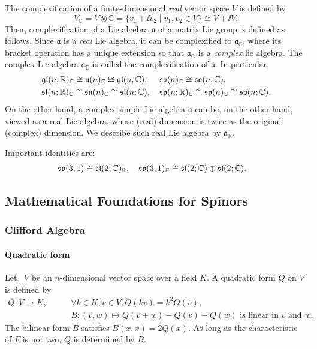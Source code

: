 \documentclass[CheatSheet]{subfiles}
\begin{document}
The complexification of a finite-dimensional \emph{real} vector space $V$ is defined by
\begin{equation}
 V_{\mathbb C}=V\otimes\mathbb C=\{v_1+\ii v_2\mathbin\mid v_1,v_2\in V\}\cong V+\ii V.
\end{equation}
Then, complexification of a Lie algebra $\mathfrak a$ of a matrix Lie group is defined as follows.
Since $\mathfrak a$ is a \emph{real} Lie algebra, it can be complexified to $\mathfrak a_{\mathbb C}$, where its bracket operation has a unique extension so that $\mathfrak a_{\mathbb C}$ is a \emph{complex} lie algebra.
The complex Lie algebra $\mathfrak a_{\mathbb C}$ is called the complexification of $\mathfrak a$.
In particular,
\begin{align}\notag
 &
 \mathop{\mathfrak{gl}}(n;\mathbb R)_{\mathbb C}
 \cong \mathop{\mathfrak{u}}(n)_{\mathbb C}
 \cong \mathop{\mathfrak{gl}}(n;\mathbb C),&
 &
 \mathop{\mathfrak{so}}(n)_{\mathbb C}
 \cong \mathop{\mathfrak{so}}(n;\mathbb C),\\
 &
 \mathop{\mathfrak{sl}}(n;\mathbb R)_{\mathbb C}
 \cong \mathop{\mathfrak{su}}(n)_{\mathbb C}
 \cong \mathop{\mathfrak{sl}}(n;\mathbb C),&
 &
 \mathop{\mathfrak{sp}}(n;\mathbb R)_{\mathbb C}
 \cong \mathop{\mathfrak{sp}}(n)_{\mathbb C}
 \cong \mathop{\mathfrak{sp}}(n;\mathbb C).
\end{align}
On the other hand, a complex simple Lie algebra $\mathfrak a$ can be, on the other hand, viewed as a real Lie algebra, whose (real) dimension is twice as the original (complex) dimension.
We describe such real Lie algebra by $\mathfrak a_{\mathbb R}$.

Important identities are:
\begin{align}
 &\operatorname{\mathfrak{so}}(3,1)\cong \operatorname{\mathfrak{sl}}(2;\mathbb C)_{\mathbb R},&
 &\operatorname{\mathfrak{so}}(3,1)_{\mathbb C}\cong \operatorname{\mathfrak{sl}}(2;\mathbb C)\oplus\operatorname{\mathfrak{sl}}(2;\mathbb C).
\end{align}


\subsection{Mathematical Foundations for Spinors}
\subsubsection{Clifford Algebra}
\paragraph{Quadratic form}
Let~\cite[\S6.3]{Jacobson1} $V$ be an $n$-dimensional vector space over a field $K$. A quadratic form $Q$ on $V$ is defined by
\begin{equation}
\begin{split}
   Q\colon V\to K,\qquad
   &\forall k\in K, v\in V, Q(k v)=k^2Q(v),\\
   &B\colon (v,w)\mapsto Q(v+w)-Q(v)-Q(w)\text{~is linear in $v$ and $w$.}
\end{split}
\end{equation}
The bilinear form $B$ satisfies $B(x,x)=2Q(x)$. As long as the characteristic of $F$ is not two, $Q$ is determined by $B$.
\end{document}
